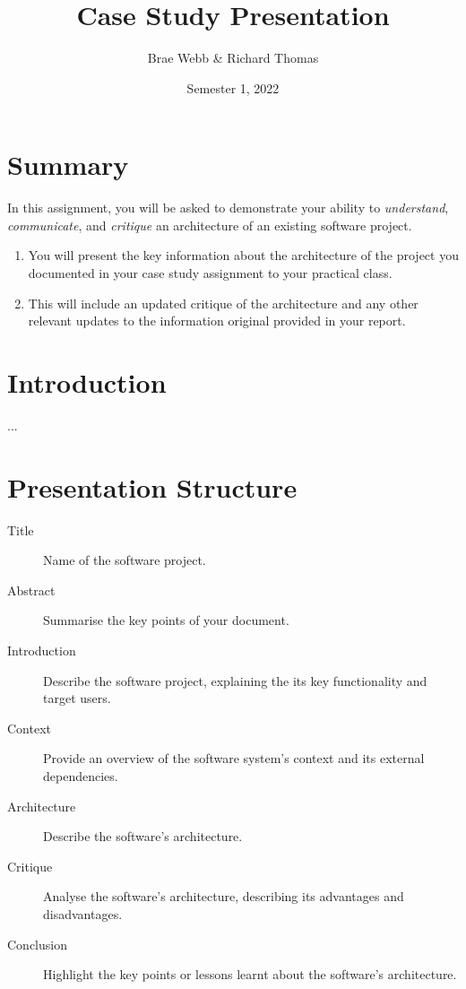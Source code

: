 \documentclass{csse4400}
\title{Case Study Presentation}
\author{Brae Webb \& Richard Thomas}
\date{Semester 1, 2022}
\begin{document}
\maketitle

\section*{Summary}
In this assignment, you will be asked to demonstrate your ability to
\textsl{understand}, \textsl{communicate}, and \textsl{critique} an architecture of an existing software project.
\begin{enumerate}
    \item You will present the key information about the architecture of the project you documented in your case study assignment to your practical class.
    \item This will include an updated critique of the architecture and any other relevant updates to the information original provided in your report.
\end{enumerate}


\section{Introduction}
...


\section{Presentation Structure}

\begin{description}
    \item[Title] Name of the software project.
    \item[Abstract] Summarise the key points of your document.
    \item[Introduction] Describe the software project, explaining the its key functionality and target users.
    \item[Context] Provide an overview of the software system's context and its external dependencies.
    \item[Architecture] Describe the software's architecture.
    \item[Critique] Analyse the software's architecture, describing its advantages and disadvantages.
    \item[Conclusion] Highlight the key points or lessons learnt about the software's architecture.
\end{description}
\end{document}
